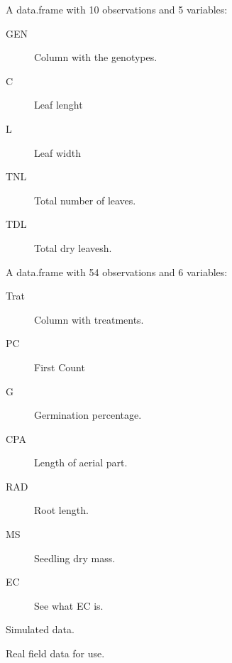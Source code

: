 \documentclass[a4paper]{book}
\begin{document}
\begin{Format}
A data.frame with 10 observations and 5 variables:
\begin{description}

\item[GEN] Column with the genotypes.
\item[C] Leaf lenght
\item[L] Leaf width
\item[TNL] Total number of leaves.
\item[TDL] Total dry leavesh.

\end{description}


A data.frame with 54 observations and 6 variables:
\begin{description}

\item[Trat] Column with treatments.
\item[PC] First Count
\item[G] Germination percentage.
\item[CPA] Length of aerial part.
\item[RAD] Root length.
\item[MS] Seedling dry mass.
\item[EC] See what EC is.

\end{description}

\end{Format}
%
\begin{Source}
Simulated data.

Real field data for use.
\end{Source}
\printindex{}
\end{document}
